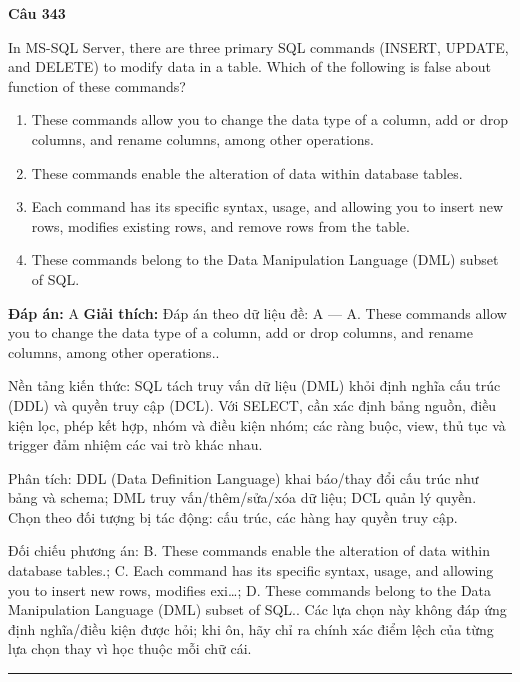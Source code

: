 \documentclass[11pt,a4paper]{article}
\newenvironment{question}[1]{%
  \par\vspace{1em}\noindent\textbf{\large Câu #1}\par\vspace{0.4em}
}{%
  \par\vspace{1em}\hrule\vspace{0.6em}
}
\newenvironment{choices}{%
  \begin{enumerate}[label=\textbf{\Alph*.},leftmargin=2.2em,itemsep=2pt,topsep=3pt]
}{%
  \end{enumerate}
}
\newcommand{\choice}{\item}
\begin{document}
\begin{question}{343}
In MS-SQL Server, there are three primary SQL commands (INSERT, UPDATE, and DELETE) to modify data
in a table. Which of the following is false about function of these commands?
\begin{choices}
\choice These commands allow you to change the data type of a column, add or drop columns, and rename columns, among other operations.
\choice These commands enable the alteration of data within database tables.
\choice Each command has its specific syntax, usage, and allowing you to insert new rows, modifies existing rows, and remove rows from the table.
\choice These commands belong to the Data Manipulation Language (DML) subset of SQL.
\end{choices}
\textbf{Đáp án:} A
\textbf{Giải thích:} Đáp án theo dữ liệu đề: A — A. These commands allow you to change the data type of a column, add or drop columns, and rename columns, among other operations..

Nền tảng kiến thức: SQL tách truy vấn dữ liệu (DML) khỏi định nghĩa cấu trúc (DDL) và quyền truy cập (DCL). Với SELECT, cần xác định bảng nguồn, điều kiện lọc, phép kết hợp, nhóm và điều kiện nhóm; các ràng buộc, view, thủ tục và trigger đảm nhiệm các vai trò khác nhau.

Phân tích: DDL (Data Definition Language) khai báo/thay đổi cấu trúc như bảng và schema; DML truy vấn/thêm/sửa/xóa dữ liệu; DCL quản lý quyền. Chọn theo đối tượng bị tác động: cấu trúc, các hàng hay quyền truy cập.

Đối chiếu phương án: B. These commands enable the alteration of data within database tables.; C. Each command has its specific syntax, usage, and allowing you to insert new rows, modifies exi…; D. These commands belong to the Data Manipulation Language (DML) subset of SQL.. Các lựa chọn này không đáp ứng định nghĩa/điều kiện được hỏi; khi ôn, hãy chỉ ra chính xác điểm lệch của từng lựa chọn thay vì học thuộc mỗi chữ cái.
\end{question}
\end{document}
